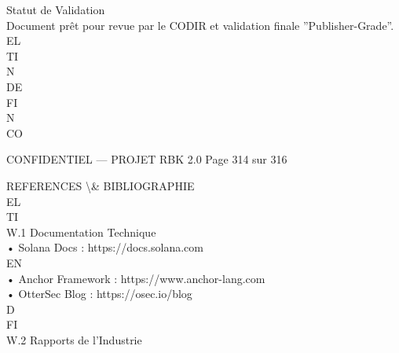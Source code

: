 \vspace{0.5em}
\vspace{0.5em}
\vspace{0.5em}
Statut de Validation\\
Document prêt pour revue par le CODIR et validation finale ”Publisher-Grade”.\\
\vspace{0.5em}
\vspace{0.5em}
\vspace{0.5em}
\vspace{0.5em}
EL\\
TI\\
N\\
DE\\
FI\\
N\\
CO\\
\vspace{0.5em}
\vspace{0.5em}
\vspace{0.5em}
\vspace{0.5em}
\begin{confidential}CONFIDENTIEL — PROJET RBK 2.0                                        Page 314 sur 316\end{confidential}
REFERENCES \textbackslash{}& BIBLIOGRAPHIE\\
\vspace{0.5em}
\vspace{0.5em}
\vspace{0.5em}
\vspace{0.5em}
EL\\
TI\\
W.1 Documentation Technique\\
• Solana Docs : https://docs.solana.com\\
\vspace{0.5em}
\vspace{0.5em}
\vspace{0.5em}
\vspace{0.5em}
EN\\
• Anchor Framework : https://www.anchor-lang.com\\
• OtterSec Blog : https://osec.io/blog\\
\vspace{0.5em}
\vspace{0.5em}
\vspace{0.5em}
\vspace{0.5em}
D\\
FI\\
W.2 Rapports de l’Industrie\\

